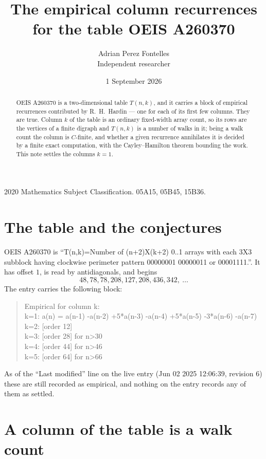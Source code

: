 \documentclass[11pt,a4paper]{article}
\title{The empirical column recurrences for the table OEIS A260370}
\author{Adrian Perez Fontelles\\ \small Independent researcher}
\date{1 September 2026}
\theoremstyle{plain}
\theoremstyle{definition}
\begin{document}
\maketitle

\begin{abstract}
OEIS A260370 is a two-dimensional table $T(n,k)$, and it carries a block of empirical
recurrences contributed by R.~H.~Hardin --- one for each of its first few columns. They are
true. Column $k$ of the table is an ordinary fixed-width array count, so its rows are the
vertices of a finite digraph and $T(n,k)$ is a number of walks in it; being a walk count the
column is $C$-finite, and whether a given recurrence annihilates it is decided by a finite
exact computation, with the Cayley--Hamilton theorem bounding the work. This note settles the columns $k=1$.
\end{abstract}

\noindent\small 2020 Mathematics Subject Classification. 05A15, 05B45, 15B36.\normalsize

\section{The table and the conjectures}

OEIS A260370 is ``T(n,k)=Number of (n+2)X(k+2) 0..1 arrays with each 3X3 subblock having clockwise perimeter pattern 00000001 00000011 or 00001111.''. It has offset $1$, is
read by antidiagonals, and begins
\[
48, 78, 78, 208, 127, 208, 436, 342,\ \dots
\]
The entry carries the following block:
\begin{quote}\small
Empirical for column k:\\
k=1: a(n) = a(n-1) -a(n-2) +5*a(n-3) -a(n-4) +5*a(n-5) -3*a(n-6) -a(n-7)\\
k=2: [order 12]\\
k=3: [order 28] for n>30\\
k=4: [order 44] for n>46\\
k=5: [order 64] for n>66\\
\end{quote}
As of the ``Last modified'' line on the live entry (Jun 02 2025 12:06:39, revision 6) these are still
recorded as empirical, and nothing on the entry records any of them as settled.

\section{A column of the table is a walk count}
\end{document}
